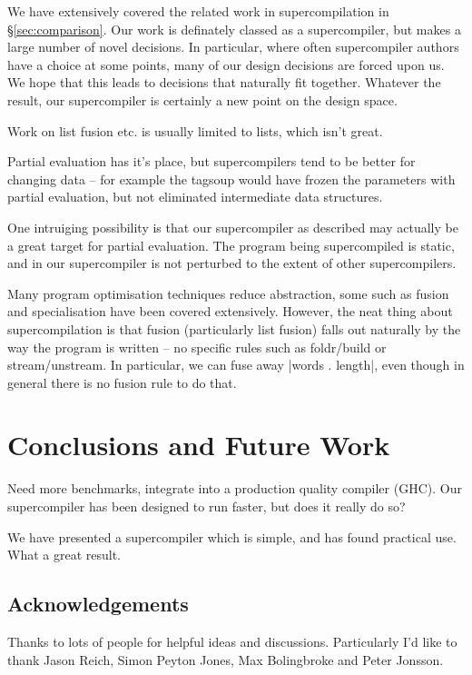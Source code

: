 \documentclass{sigplanconf}
\begin{document}
We have extensively covered the related work in supercompilation in \S\ref{sec:comparison}. Our work is definately classed as a supercompiler, but makes a large number of novel decisions. In particular, where often supercompiler authors have a choice at some points, many of our design decisions are forced upon us. We hope that this leads to decisions that naturally fit together. Whatever the result, our supercompiler is certainly a new point on the design space.

Work on list fusion etc. is usually limited to lists, which isn't great.

Partial evaluation has it's place, but supercompilers tend to be better for changing data -- for example the tagsoup would have frozen the parameters with partial evaluation, but not eliminated intermediate data structures.

One intruiging possibility is that our supercompiler as described may actually be a great target for partial evaluation. The program being supercompiled is static, and in our supercompiler is not perturbed to the extent of other supercompilers.

Many program optimisation techniques reduce abstraction, some such as fusion and specialisation have been covered extensively. However, the neat thing about supercompilation is that fusion (particularly list fusion) falls out naturally by the way the program is written -- no specific rules such as foldr/build or stream/unstream. In particular, we can fuse away |words . length|, even though in general there is no fusion rule to do that.



\section{Conclusions and Future Work}

Need more benchmarks, integrate into a production quality compiler (GHC). Our supercompiler has been designed to run faster, but does it really do so?

We have presented a supercompiler which is simple, and has found practical use. What a great result.


\subsection{Acknowledgements}

Thanks to lots of people for helpful ideas and discussions. Particularly I'd like to thank Jason Reich, Simon Peyton Jones, Max Bolingbroke and Peter Jonsson.



\end{document}
